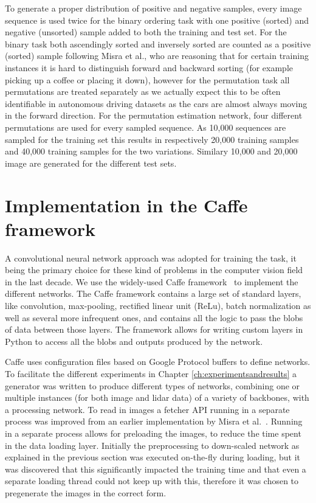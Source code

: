 To generate a proper distribution of positive and negative samples, every image sequence is used twice for the binary ordering task with one positive (sorted) and negative (unsorted) sample added to both the training and test set. For the binary task both ascendingly sorted and inversely sorted are counted as a positive (sorted) sample following Misra et al., who are reasoning that for certain training instances it is hard to distinguish forward and backward sorting (for example picking up a coffee or placing it down), however for the permutation task all permutations are treated separately as we actually expect this to be often identifiable in autonomous driving datasets as the cars are almost always moving in the forward direction. For the permutation estimation network, four different permutations are used for every sampled sequence. As 10,000 sequences are sampled for the training set this results in respectively 20,000 training samples and 40,000 training samples for the two variations. Similary 10,000 and 20,000 image are generated for the different test sets. 

\section{Implementation in the Caffe framework}
A convolutional neural network approach was adopted for training the task, it being the primary choice for these kind of problems in the computer vision field in the last decade. We use the widely-used Caffe framework~\cite{jia2014} to implement the different networks. The Caffe framework contains a large set of standard layers, like convolution, max-pooling, rectified linear unit (ReLu), batch normalization as well as several more infrequent ones, and contains all the logic to pass the blobs of data between those layers. The framework allows for writing custom layers in Python to access all the blobs and outputs produced by the network.

Caffe uses configuration files based on Google Protocol buffers to define networks. To facilitate the different experiments in Chapter \ref{ch:experimentsandresults} a generator was written to produce different types of networks, combining one or multiple instances (for both image and lidar data) of a variety of backbones, with a processing network. To read in images a fetcher API running in a separate process was improved from an earlier implementation by Misra et al.~\cite{misra2016}. Running in a separate process allows for preloading the images, to reduce the time spent in the data loading layer. Initially the preprocessing to down-scaled network as explained in the previous section was executed on-the-fly during loading, but it was discovered that this significantly impacted the training time and that even a separate loading thread could not keep up with this, therefore it was chosen to pregenerate the images in the correct form.

